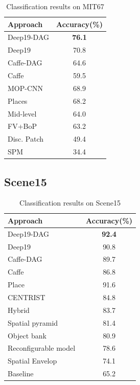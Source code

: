 \documentclass[10pt,twocolumn,letterpaper]{article}
\begin{document}
\begin{table}
\begin{center}
\begin{tabular}{|l|c|}
\hline
Approach & Accuracy(\%) \\
\hline
Deep19-DAG & \textbf{76.1} \\
Deep19~\cite{veryDeep} & 70.8 \\
Caffe-DAG & 64.6	\\
Caffe~\cite{Caffe} & 59.5 \\ \hline
MOP-CNN~\cite{Gong14} & 68.9 \\
Places~\cite{zhoulearning}	& 68.2	\\
Mid-level~\cite{mid_level} & 64.0	\\
FV+BoP~\cite{FV_BoP} & 63.2 \\
Disc. Patch~\cite{disc_patch} & 49.4 \\
SPM~\cite{spatial_pyramid} & 34.4	\\
\hline
\end{tabular}
\end{center}
\caption{Classification results on MIT67}
\label{table:MIT67}
\end{table}


\subsection{Scene15}

\begin{table}
\begin{center}
\begin{tabular}{|l|c|}
\hline
Approach & Accuracy(\%) \\
\hline
Deep19-DAG & \textbf{92.4} \\
Deep19~\cite{veryDeep} & 90.8 \\
Caffe-DAG & 89.7	\\
Caffe~\cite{Caffe} & 86.8 \\ \hline
Place~\cite{zhoulearning} & 91.6 \\
CENTRIST~\cite{Wu_pami11} & 84.8	\\
Hybrid~\cite{Bosch_pami08}	& 83.7	\\
Spatial pyramid~\cite{spatial_pyramid} & 81.4 \\
Object bank~\cite{Li_nips10_objectbank}	& 80.9	\\
Reconfigurable model~\cite{Parizi_cvpr12_reconf} & 78.6	\\
Spatial Envelop~\cite{Oliva_ijcv01_envelop} & 74.1 \\
Baseline~\cite{Scene15} & 65.2 \\
\hline
\end{tabular}
\end{center}
\caption{Classification results on Scene15}
\label{table:SUN397}
\end{table}
\end{document}
